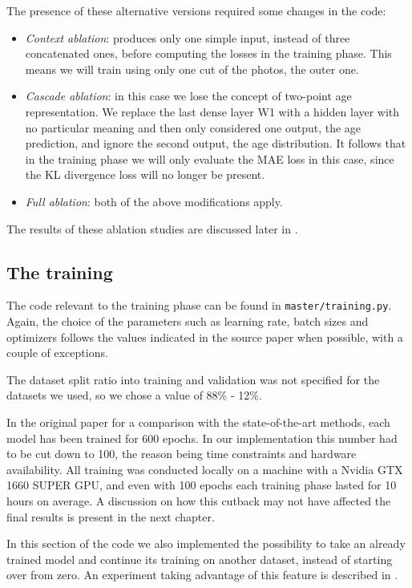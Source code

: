 The presence of these alternative versions required some changes in the code:

\begin{itemize}
    \item \textit{Context ablation}: produces only one simple input, instead of three concatenated ones, 
    before computing the losses in the training phase. This means we will train using only one cut of the 
    photos, the outer one.
    \item \textit{Cascade ablation}: in this case we lose the concept of two-point age representation.
    We replace the last dense layer W1 with a hidden layer with no particular meaning and then only
    considered one output, the age prediction, and ignore the second output, the age distribution.
    It follows that in the training phase we will only evaluate the MAE loss in this case, since the KL 
    divergence loss will no longer be present. 
    \item \textit{Full ablation}: both of the above modifications apply.
\end{itemize}

The results of these ablation studies are discussed later in .

\subsection*{The training}
The code relevant to the training phase can be found in \texttt{master/training.py}. Again, the choice of
the parameters such as learning rate, batch sizes and optimizers follows the values indicated in the source 
paper when possible, with a couple of exceptions.

The dataset split ratio into training and validation was not specified for the datasets we used, so we 
chose a value of 88\% - 12\%.

In the original paper for a comparison with the state-of-the-art methods, each model has been trained for 
600 epochs. In our implementation this number had to be cut down to 100, the reason being time constraints 
and hardware availability. All training was conducted locally on a machine with a Nvidia GTX 1660 SUPER GPU, 
and even with 100 epochs each training phase lasted for 10 hours on average. A discussion on how this 
cutback may not have affected the final results is present in the next chapter.

In this section of the code we also implemented the possibility to take an already trained model and continue
its training on another dataset, instead of starting over from zero. An experiment taking advantage of this 
feature is described in .



